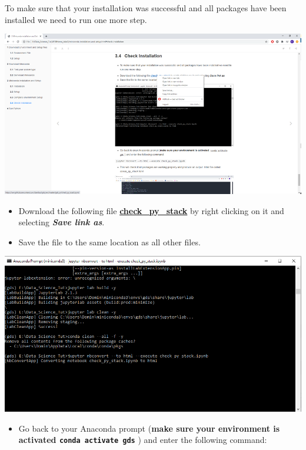 \documentclass[
]{book}
\providecommand{\tightlist}{%
  \setlength{\itemsep}{0pt}\setlength{\parskip}{0pt}}
\begin{document}
To make sure that your installation was successful and all packages have been installed we need to run one more step.

\begin{center}\includegraphics[width=12.93in]{figs/chp4/Picture22} \end{center}

\begin{itemize}
\tightlist
\item
  Download the following file \href{https://raw.githubusercontent.com/darribas/gds_env/master/gds_py/check_py_stack.ipynb}{\textbf{check\_py\_stack}} by right clicking on it and selecting \textbf{\emph{Save link as}}.
\item
  Save the file to the same location as all other files.
\end{itemize}

\begin{center}\includegraphics[width=13.58in]{figs/chp4/Conda_11} \end{center}

\begin{itemize}
\tightlist
\item
  Go back to your Anaconda prompt (\textbf{make sure your environment is activated \texttt{conda\ activate\ gds} }) and enter the following command:
\end{itemize}
\end{document}
